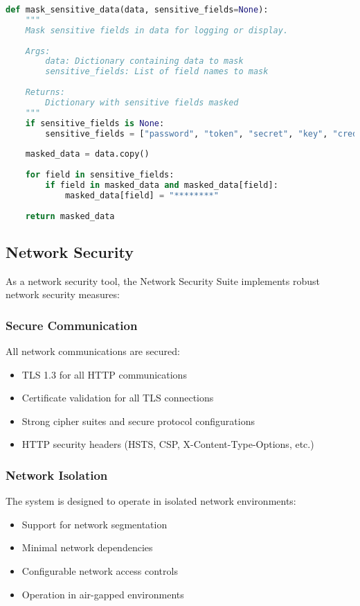 \begin{lstlisting}[language=python, caption=Sensitive Data Masking Example]
def mask_sensitive_data(data, sensitive_fields=None):
    """
    Mask sensitive fields in data for logging or display.
    
    Args:
        data: Dictionary containing data to mask
        sensitive_fields: List of field names to mask
        
    Returns:
        Dictionary with sensitive fields masked
    """
    if sensitive_fields is None:
        sensitive_fields = ["password", "token", "secret", "key", "credential"]
        
    masked_data = data.copy()
    
    for field in sensitive_fields:
        if field in masked_data and masked_data[field]:
            masked_data[field] = "********"
            
    return masked_data
\end{lstlisting}

\subsection{Network Security}
As a network security tool, the Network Security Suite implements robust network security measures:

\subsubsection{Secure Communication}
All network communications are secured:

\begin{itemize}
    \item TLS 1.3 for all HTTP communications
    \item Certificate validation for all TLS connections
    \item Strong cipher suites and secure protocol configurations
    \item HTTP security headers (HSTS, CSP, X-Content-Type-Options, etc.)
\end{itemize}

\subsubsection{Network Isolation}
The system is designed to operate in isolated network environments:

\begin{itemize}
    \item Support for network segmentation
    \item Minimal network dependencies
    \item Configurable network access controls
    \item Operation in air-gapped environments
\end{itemize}

